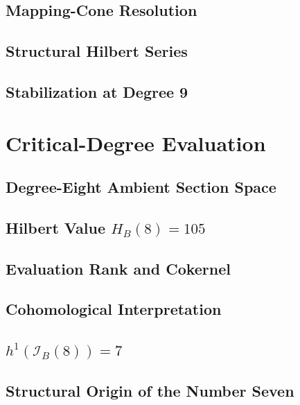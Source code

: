 \subsection{Mapping-Cone Resolution}

\subsection{Structural Hilbert Series}

\subsection{Stabilization at Degree 9}

\section{Critical-Degree Evaluation}\label{sec:critical-evaluation}


\subsection{Degree-Eight Ambient Section Space}

\subsection{Hilbert Value \(H_B(8)=105\)}

\subsection{Evaluation Rank and Cokernel}

\subsection{Cohomological Interpretation}

\subsection{\(h^1(\mathcal I_B(8))=7\)}

\subsection{Structural Origin of the Number Seven}

